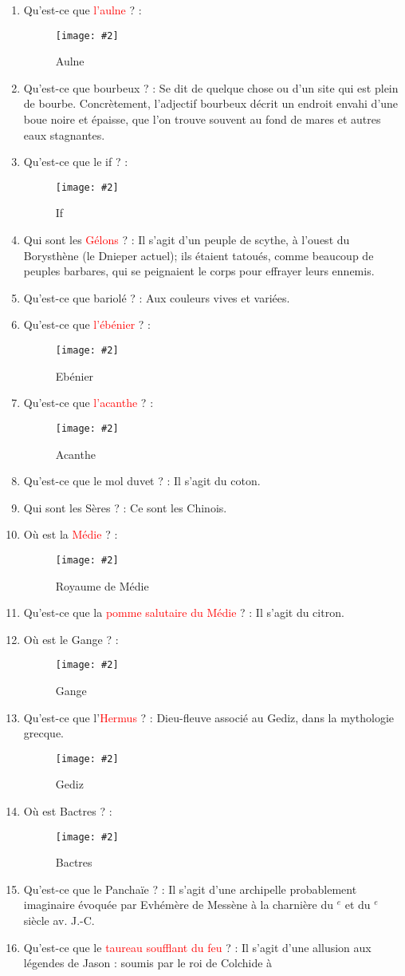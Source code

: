 \documentclass[a4paper, 11pt, hidelinks]{article}
\newcommand{\rb}[1]{\Romanbar{#1}}
\newcommand{\img}[4]{\begin{figure}[!ht]
    \centering
    \texttt{[image: \#2]}
    \caption{#3}
    \label{#4}
    \end{figure} }
\begin{document}
\begin{enumerate}
      \item Qu'est-ce que \textcolor{red}{l'aulne} ? :
            \img{0.5}{Aulne.jpg}{Aulne}{70}
      \item Qu'est-ce que bourbeux ? : Se dit de quelque chose ou d'un site qui est plein de bourbe. Concrètement, l'adjectif
            bourbeux décrit un endroit envahi d'une boue noire et épaisse, que l'on trouve souvent au fond de mares et autres eaux
            stagnantes.
      \item Qu'est-ce que le if ? :
            \img{0.4}{If.jpg}{If}{71}
            \newpage
      \item Qui sont les \textcolor{red}{Gélons} ? : Il s'agit d'un peuple de scythe, à l'ouest du Borysthène (le Dnieper actuel); ils étaient tatoués,
            comme beaucoup de peuples barbares, qui se peignaient le corps pour effrayer leurs ennemis.
      \item Qu'est-ce que bariolé ? : Aux couleurs vives et variées.
      \item Qu'est-ce que \textcolor{red}{l'ébénier} ? :
            \img{0.5}{Ebenier.jpg}{Ebénier}{72}
      \item Qu'est-ce que \textcolor{red}{l'acanthe} ? :
            \img{0.4}{Acanthe.jpg}{Acanthe}{73}
      \item Qu'est-ce que le mol duvet ? : Il s'agit du coton.
      \item Qui sont les Sères ? : Ce sont les Chinois.
      \item Où est la \textcolor{red}{Médie} ? :
            \img{0.4}{Medie.png}{Royaume de Médie}{74}
      \item Qu'est-ce que la \textcolor{red}{pomme salutaire du Médie} ? : Il s'agit du citron.
      \item Où est le Gange ? :
            \img{0.5}{Gange.jpg}{Gange}{75}
      \item Qu'est-ce que l'\textcolor{red}{Hermus} ? : Dieu-fleuve associé au Gediz, dans la mythologie grecque.
            \img{1}{Gediz.png}{Gediz}{76}
      \item Où est Bactres ? :
            \img{0.5}{Bactres.png}{Bactres}{77}
      \item Qu'est-ce que le Panchaïe ? : Il s'agit d'une archipelle probablement imaginaire évoquée par Evhémère de Messène à la
            charnière du \rb{4}$^e$ et du \rb{3}$^e$ siècle av. J.-C.
      \item Qu'est-ce que le \textcolor{red}{taureau soufflant du feu} ? : Il s'agit d'une allusion aux légendes de Jason : soumis par le roi de Colchide à

\end{enumerate}
\end{document}

